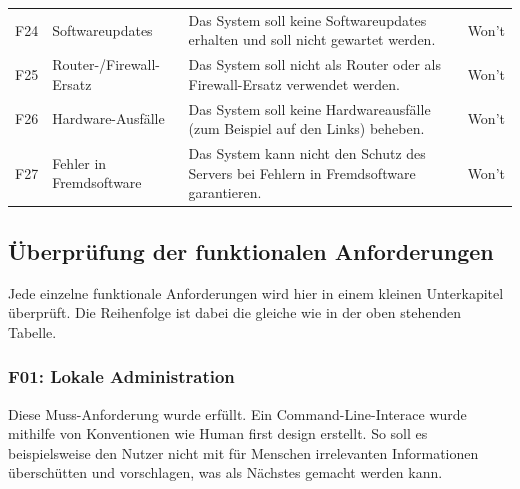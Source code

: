 \documentclass[../review_3.tex]{subfiles}
\begin{document}
\begin{longtable} [h] {p{1cm} p{4cm} p{7cm} l}
    F24                                                                                                                                                                                                              & Softwareupdates                                & Das System soll keine Softwareupdates erhalten und soll nicht gewartet werden.                                                                                                                                                                                      & Won't           \\
    F25                                                                                                                                                                                                              & Router-/Firewall-Ersatz                                & Das System soll  nicht als Router oder als Firewall-Ersatz verwendet werden.                                                                                                   & Won't           \\
    F26                                                                                                                                                                                                              & Hardware-Ausfälle                              & Das System soll keine Hardwareausfälle (zum Beispiel auf den Links) beheben.                                             & Won't           \\
    F27                                                                                                                                                                                                              & Fehler in Fremdsoftware                              & Das System kann nicht den Schutz des Servers bei Fehlern in Fremdsoftware garantieren.    & Won't        \\ \bottomrule
\end{longtable} %

\subsection{Überprüfung der funktionalen Anforderungen}
Jede einzelne funktionale Anforderungen wird hier in einem kleinen Unterkapitel überprüft. Die Reihenfolge ist dabei die gleiche wie in der oben stehenden Tabelle.

\subsubsection{F01: Lokale Administration}
Diese Muss-Anforderung wurde erfüllt. Ein Command-Line-Interace wurde mithilfe von Konventionen wie \glqq Human first design\grqq{} erstellt. So soll es beispielsweise den Nutzer nicht mit für Menschen irrelevanten Informationen überschütten und vorschlagen, was als Nächstes gemacht werden kann.
\end{document}
